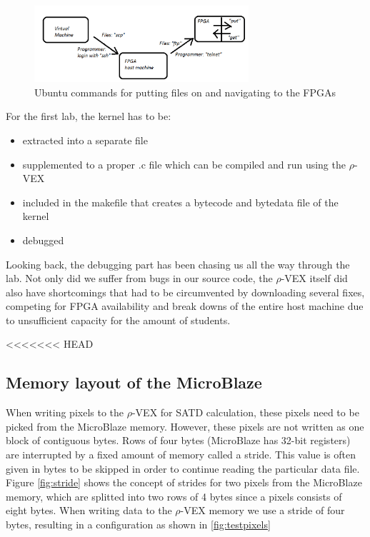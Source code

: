 \begin{figure}[htb]%
\centering
\includegraphics[width=300px]{Pictures/hop}%
\caption{Ubuntu commands for putting files on and navigating to the FPGAs}%
\label{fig:hoppen}%
\end{figure}

For the first lab, the  kernel has to be:
\begin{itemize}
	\item extracted into a separate file
	\item supplemented to a proper .c file which can be compiled and run using the $\rho$-VEX
	\item included in the makefile that creates a bytecode and bytedata file of the kernel
	\item debugged
\end{itemize}

Looking back, the debugging part has been chasing us all the way through the lab. Not only did we suffer from bugs in our source code, the $\rho$-VEX itself did also have shortcomings that had to be circumvented by downloading several fixes, competing for FPGA availability and break downs of the entire host machine due to unsufficient capacity for the amount of students.

<<<<<<< HEAD
\subsection{Memory layout of the MicroBlaze}

When writing pixels to the $\rho$-VEX for SATD calculation, these pixels need to be picked from the MicroBlaze memory. However, these pixels are not written as one block of contiguous bytes. Rows of four bytes (MicroBlaze has 32-bit registers) are interrupted by a fixed amount of memory called a stride. This value is often given in bytes to be skipped in order to continue reading the particular data file. Figure \ref{fig:stride} shows the concept of strides for two pixels from the MicroBlaze memory, which are splitted into two rows of 4 bytes since a pixels consists of eight bytes. When writing data to the $\rho$-VEX memory we use a stride of four bytes, resulting in a configuration as shown in \ref{fig:testpixels}

